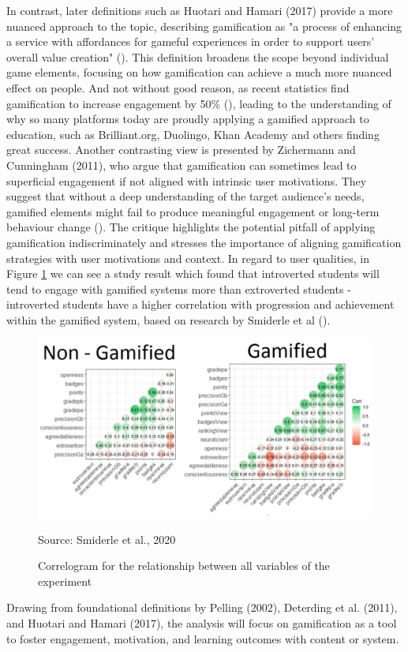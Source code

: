 In contrast, later definitions such as Huotari and Hamari (2017) provide a more nuanced approach to the topic, describing gamification as "a process of enhancing a service with affordances for gameful experiences in order to support users' overall value creation" (\cite{redefinition}).
This definition broadens the scope beyond individual game elements, focusing on how gamification can achieve a much more nuanced effect on people. 
And not without good reason, as recent statistics find gamification to increase engagement by 50\% (\cite{90increasedLearning}), leading to the understanding of why so many platforms today are proudly applying a gamified approach to education, such as Brilliant.org, Duolingo, Khan Academy and others finding great success. 
Another contrasting view is presented by Zichermann and Cunningham (2011), who argue that gamification can sometimes lead to superficial engagement if not aligned with intrinsic user motivations. 
They suggest that without a deep understanding of the target audience's needs, gamified elements might fail to produce meaningful engagement or long-term behaviour change (\cite{bookOnEngagement}). 
The critique highlights the potential pitfall of applying gamification indiscriminately and stresses the importance of aligning gamification strategies with user motivations and context. In regard to user qualities, in Figure \ref{fig:gamifiedVSnongamified} we can see a study result which found that introverted students will tend to engage with gamified systems more than extroverted students - introverted students have a higher correlation with progression and achievement within the gamified system, based on research by Smiderle et al (\cite{gamifiedChart}).\\
\begin{figure}[htbp]
 \centering
 \includegraphics[width=\textwidth]{Media/chart.png}
 \caption{Correlogram for the relationship between all variables of the experiment}
 \label{fig:gamifiedVSnongamified}
 {\raggedright \small{Source: Smiderle et al., 2020}\par}
\end{figure}
Drawing from foundational definitions by Pelling (2002), Deterding et al. (2011), and Huotari and Hamari (2017), the analysis will focus on gamification as a tool to foster engagement, motivation, and learning outcomes with content or system.

